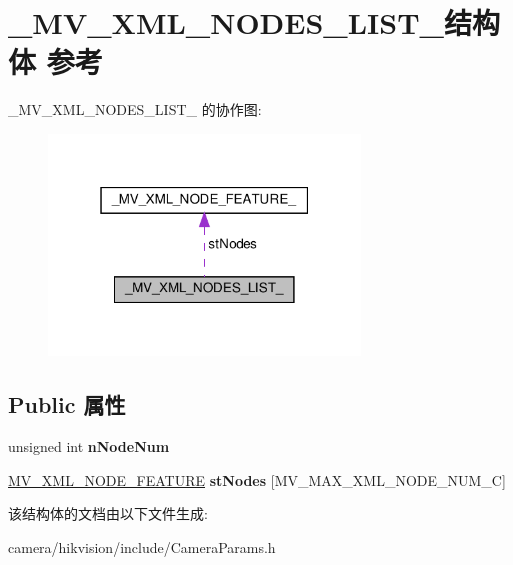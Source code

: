 \hypertarget{struct___m_v___x_m_l___n_o_d_e_s___l_i_s_t__}{}\section{\+\_\+\+M\+V\+\_\+\+X\+M\+L\+\_\+\+N\+O\+D\+E\+S\+\_\+\+L\+I\+S\+T\+\_\+结构体 参考}
\label{struct___m_v___x_m_l___n_o_d_e_s___l_i_s_t__}


\+\_\+\+M\+V\+\_\+\+X\+M\+L\+\_\+\+N\+O\+D\+E\+S\+\_\+\+L\+I\+S\+T\+\_\+ 的协作图\+:\nopagebreak
\begin{figure}[H]
\begin{center}
\leavevmode
\includegraphics[width=235pt]{struct___m_v___x_m_l___n_o_d_e_s___l_i_s_t____coll__graph}
\end{center}
\end{figure}
\subsection*{Public 属性}
\begin{DoxyCompactItemize}
\item 
\mbox{\label{struct___m_v___x_m_l___n_o_d_e_s___l_i_s_t___a1e52ea16c46b23441ba295f9e357246a}} 
unsigned int {\bfseries n\+Node\+Num}
\item 
\mbox{\label{struct___m_v___x_m_l___n_o_d_e_s___l_i_s_t___a4e6e02432efe6b29991ceb0575739c0d}} 
\hyperlink{struct___m_v___x_m_l___n_o_d_e___f_e_a_t_u_r_e__}{M\+V\+\_\+\+X\+M\+L\+\_\+\+N\+O\+D\+E\+\_\+\+F\+E\+A\+T\+U\+RE} {\bfseries st\+Nodes} \mbox{[}M\+V\+\_\+\+M\+A\+X\+\_\+\+X\+M\+L\+\_\+\+N\+O\+D\+E\+\_\+\+N\+U\+M\+\_\+C\mbox{]}
\end{DoxyCompactItemize}


该结构体的文档由以下文件生成\+:\begin{DoxyCompactItemize}
\item 
camera/hikvision/include/Camera\+Params.\+h\end{DoxyCompactItemize}
